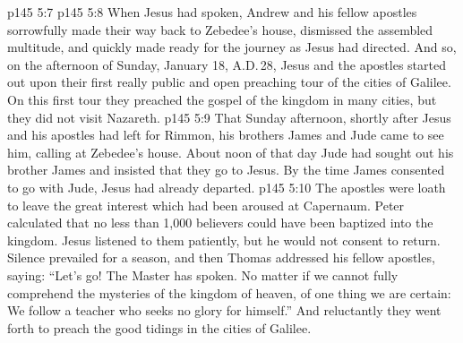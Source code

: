 \vs p145 5:7 
\vs p145 5:8 When Jesus had spoken, Andrew and his fellow apostles sorrowfully made their way back to Zebedee’s house, dismissed the assembled multitude, and quickly made ready for the journey as Jesus had directed. And so, on the afternoon of Sunday, January 18, A.D.\,28, Jesus and the apostles started out upon their first really public and open preaching tour of the cities of Galilee. On this first tour they preached the gospel of the kingdom in many cities, but they did not visit Nazareth.
\vs p145 5:9 That Sunday afternoon, shortly after Jesus and his apostles had left for Rimmon, his brothers James and Jude came to see him, calling at Zebedee’s house. About noon of that day Jude had sought out his brother James and insisted that they go to Jesus. By the time James consented to go with Jude, Jesus had already departed.
\vs p145 5:10 The apostles were loath to leave the great interest which had been aroused at Capernaum. Peter calculated that no less than 1,000 believers could have been baptized into the kingdom. Jesus listened to them patiently, but he would not consent to return. Silence prevailed for a season, and then Thomas addressed his fellow apostles, saying: “Let’s go! The Master has spoken. No matter if we cannot fully comprehend the mysteries of the kingdom of heaven, of one thing we are certain: We follow a teacher who seeks no glory for himself.” And reluctantly they went forth to preach the good tidings in the cities of Galilee.

